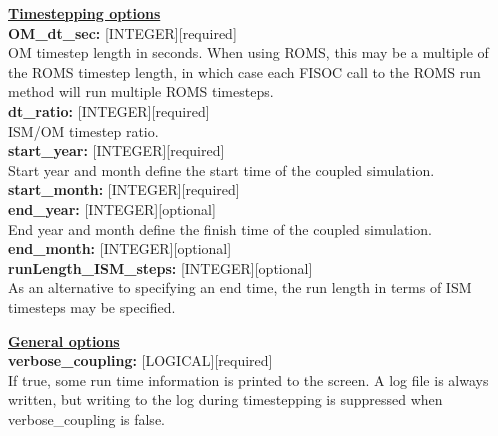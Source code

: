 \documentclass[11pt]{article}
\begin{document}
\begin{flushleft}
\textbf{\underline{Timestepping options}}                                  \\
\textbf{OM\_dt\_sec:}         [INTEGER][required]                          \\
OM timestep length in seconds.  When using ROMS, this may be a multiple 
of the ROMS timestep length, in which case each FISOC call to the ROMS 
run method will run multiple ROMS timesteps.                               \\
\vspace{6pt}
\textbf{dt\_ratio:}          [INTEGER][required]                           \\
ISM/OM timestep ratio.                                                     \\
\vspace{6pt}
\textbf{start\_year:}        [INTEGER][required]                           \\
Start year and month define the start time of the coupled simulation.      \\
\vspace{6pt}
\textbf{start\_month:}       [INTEGER][required]                           \\
\vspace{6pt}
\textbf{end\_year:}          [INTEGER][optional]                           \\
End year and month define the finish time of the coupled simulation.       \\
\vspace{6pt}
\textbf{end\_month:}         [INTEGER][optional]                           \\
\vspace{6pt}
\textbf{runLength\_ISM\_steps:} [INTEGER][optional]                        \\
As an alternative to specifying an end time, the run length in terms of 
ISM timesteps may be specified.                                            \\
\vspace{22pt}


\textbf{\underline{General options}}                                       \\
\textbf{verbose\_coupling:}  [LOGICAL][required]                           \\
If true, some run time information is printed to the screen.  
A log file is always 
written, but writing to the log during timestepping is suppressed when 
verbose\_coupling is false.\\
\end{flushleft}
\end{document}
